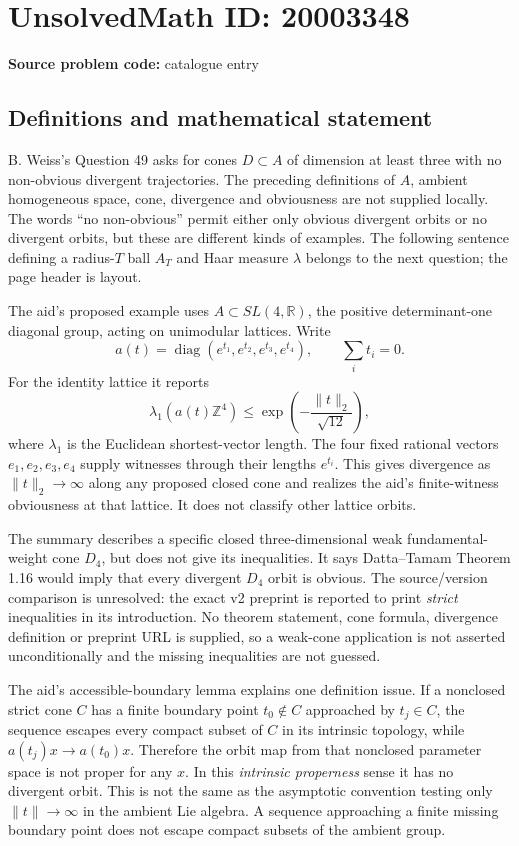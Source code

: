 \documentclass[11pt]{article}
\newcommand{\Z}{\mathbb{Z}}
\newcommand{\R}{\mathbb{R}}
\begin{document}
\section*{UnsolvedMath ID: 20003348}
\textbf{Source problem code:} catalogue entry
\subsection{Definitions and mathematical statement}
B. Weiss's Question 49 asks for cones $D\subset A$ of dimension at least three with no non-obvious divergent trajectories. The preceding definitions of $A$, ambient homogeneous space, cone, divergence and obviousness are not supplied locally. The words ``no non-obvious'' permit either only obvious divergent orbits or no divergent orbits, but these are different kinds of examples. The following sentence defining a radius-$T$ ball $A_T$ and Haar measure $\lambda$ belongs to the next question; the page header is layout.

The aid's proposed example uses $A\subset SL(4,\R)$, the positive determinant-one diagonal group, acting on unimodular lattices. Write
\[
 a(t)=\operatorname{diag}(e^{t_1},e^{t_2},e^{t_3},e^{t_4}),
 \qquad\sum_it_i=0.
\]
For the identity lattice it reports
\[
 \lambda_1(a(t)\Z^4)
 \leq\exp\!\left(-\frac{\|t\|_2}{\sqrt{12}}\right),
\]
where $\lambda_1$ is the Euclidean shortest-vector length. The four fixed rational vectors $e_1,e_2,e_3,e_4$ supply witnesses through their lengths $e^{t_i}$. This gives divergence as $\|t\|_2\to\infty$ along any proposed closed cone and realizes the aid's finite-witness obviousness at that lattice. It does not classify other lattice orbits.

The summary describes a specific closed three-dimensional weak fundamental-weight cone $D_4$, but does not give its inequalities. It says Datta--Tamam Theorem 1.16 would imply that every divergent $D_4$ orbit is obvious. The source/version comparison is unresolved: the exact v2 preprint is reported to print \emph{strict} inequalities in its introduction. No theorem statement, cone formula, divergence definition or preprint URL is supplied, so a weak-cone application is not asserted unconditionally and the missing inequalities are not guessed.

The aid's accessible-boundary lemma explains one definition issue. If a nonclosed strict cone $C$ has a finite boundary point $t_0\notin C$ approached by $t_j\in C$, the sequence escapes every compact subset of $C$ in its intrinsic topology, while $a(t_j)x\to a(t_0)x$. Therefore the orbit map from that nonclosed parameter space is not proper for any $x$. In this \emph{intrinsic properness} sense it has no divergent orbit. This is not the same as the asymptotic convention testing only $\|t\|\to\infty$ in the ambient Lie algebra. A sequence approaching a finite missing boundary point does not escape compact subsets of the ambient group.
\end{document}
